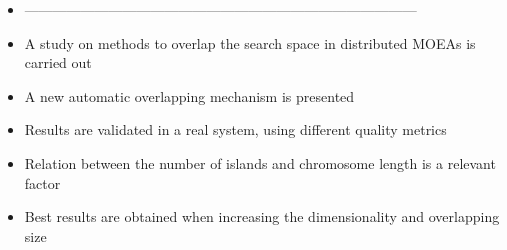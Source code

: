 \documentclass{article}
\begin{document}




\begin{itemize}
\item ------------------------------------------------------------------------------------
\item A study on methods to overlap the search space in distributed MOEAs is carried out  
\item A new automatic overlapping mechanism is presented
\item Results are validated in a real system, using different quality metrics
\item Relation between the number of islands and chromosome length is a relevant factor
\item Best results are obtained when increasing the dimensionality and overlapping size
\end{itemize}
\end{document}
